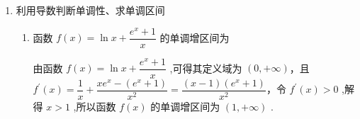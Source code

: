 \begin{enumerate}
\begin{enumerate}
\begin{jieda}
\begin{enumerate}
                \item 因为 $\dfrac{\sin x}{x} = \left( {1 - \dfrac{x}{\pi}}\right) \left( {1 + \dfrac{x}{\pi}}\right) \left( {1 - \dfrac{x}{2\pi}}\right) \left( {1 + \dfrac{x}{2\pi}}\right) \cdots \left( {1 - \dfrac{x}{n\pi}}\right) \left( {1 + \dfrac{x}{n\pi}}\right) \cdots  = \left( {1 - \dfrac{{x}^{2}}{{{\pi}}^{2}}}\right) \left( {1 - \dfrac{{x}^{2}}{4{{\pi}}^{2}}}\right) \cdots \left( {1 - \dfrac{{x}^{2}}{{n}^{2}{{\pi}}^{2}}}\right)$
                
                对 $\cos x = 1 - \dfrac{{x}^{2}}{2!} + \dfrac{{x}^{4}}{4!} - \dfrac{{x}^{6}}{6!} + \cdots  + \dfrac{{\left( -1\right) }^{n}{x}^{2n}}{\left( {2n}\right) !} + \cdots$ ,
                
                两边求导可得: $- \sin x =  - \dfrac{x}{1!} + \dfrac{{x}^{3}}{3!} - \dfrac{{x}^{5}}{5!} + \cdots  + \dfrac{{\left( -1\right) }^{n}{x}^{{2n} - 1}}{\left( {{2n} - 1}\right) !} + \cdots$ ,
                
                所以 $\sin x = \dfrac{x}{1!} - \dfrac{{x}^{3}}{3!} + \dfrac{{x}^{5}}{5!} + \cdots  + \dfrac{{\left( -1\right) }^{n - 1}{x}^{{2n} - 1}}{\left( {{2n} - 1}\right) !} + \cdots$ ,
                
                所以 $\dfrac{\sin x}{x} = 1 - \dfrac{{x}^{2}}{3!} + \dfrac{{x}^{4}}{5!} + \cdots  + \dfrac{{\left( -1\right) }^{n - 1}{x}^{{2n} - 2}}{\left( {{2n} - 1}\right) !}$
                
                比较两式中 ${x}^{2}$ 的系数，可得：$- \dfrac{1}{3!} =  - \dfrac{1}{{\pi }^{2}}\left( {\dfrac{1}{{1}^{2}} + \dfrac{1}{{2}^{2}} + \dfrac{1}{{3}^{2}}\cdots  + \dfrac{1}{{n}^{2}} + \cdots }\right)$
                
                所以 $\mathop{\sum }\limits_{{n = 1}}^{\infty }\dfrac{1}{{n}^{2}} = \dfrac{1}{{1}^{2}} + \dfrac{1}{{2}^{2}} + \dfrac{1}{{3}^{2}}\cdots  + \dfrac{1}{{n}^{2}} + \cdots  = \dfrac{{\pi}^{2}}{6}$ .
            \end{enumerate}
        \end{jieda}
    \end{enumerate}

    \item 利用导数判断单调性、求单调区间
    \begin{enumerate}
        \item 函数 $f\left( x\right)  = \ln x + \dfrac{{{e}}^{x} + 1}{x}$ 的单调增区间为
        \begin{jieda}
            由函数 $f\left( x\right)  = \ln x + \dfrac{{{e}}^{x} + 1}{x}$ ,可得其定义域为 $\left( {0, + \infty }\right)$，且 ${f}^{\prime }\left( x\right)  = \dfrac{1}{x} + \dfrac{x{{e}}^{x} - \left( {{{e}}^{x} + 1}\right) }{{x}^{2}} = \dfrac{\left( {x - 1}\right) \left( {{{e}}^{x} + 1}\right) }{{x}^{2}}$，令 ${f}^{\prime }\left( x\right)  > 0$ ,解得 $x > 1$ ,所以函数 $f\left( x\right)$ 的单调增区间为 $\left( {1, + \infty }\right)$ .
        \end{jieda}
        

\end{enumerate}
\end{enumerate}
